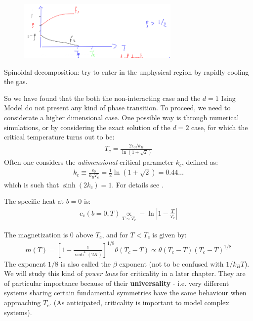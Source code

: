 \documentclass[../template.tex]{subfiles}
\begin{document}
\begin{figure}[H]
    \centering
    \includegraphics[width=0.7\textwidth]{image023.png}
    \caption{\label{fig:fluid-phases}}
\end{figure}

Spinoidal decomposition: try to enter in the unphysical region by rapidly cooling the gas. 


\medskip

So we have found that the both the non-interacting case and the $d=1$ Ising Model do not present any kind of phase transition. To proceed, we need to considerate a higher dimensional case. One possible way is through numerical simulations, or by considering the exact solution of the $d=2$ case, for which the critical temperature turns out to be:
\begin{align*}
    T_c = \frac{2 \epsilon_0 / k_B}{\ln (1 + \sqrt{2})} 
\end{align*}
Often one considers the \textit{adimensional} critical parameter $k_c$, defined as:
\begin{align*}
    k_c \equiv \frac{\epsilon_0}{k_B T_c} = \frac{1}{2} \ln (1 + \sqrt{2}) = 0.44\dots  
\end{align*} 
which is such that $\sinh(2k_c) = 1$. %
For details see \cite{huang}. 

The specific heat at $b=0$ is:
\begin{align*}
    c_v(b=0, T) \underset{T \sim T_c}{\propto} - \ln \left|1-\frac{T}{T_c}  \right|
\end{align*}

The magnetization is $0$ above $T_c$, and for $T < T_c$ is given by:
\begin{align*}
    m(T) = \left[1-\frac{1}{\sinh^4(2K)} \right]^{1/8} \theta(T_c-T) \propto \theta(T_c - T) (T_c - T)^{1/8}
\end{align*}
The exponent $1/8$ is also called the $\beta$ exponent (not to be confused with $1/k_B T$). We will study this kind of \textit{power laws} for criticality in a later chapter. They are of particular importance because of their \textbf{universality} - i.e. very different systems sharing certain fundamental symmetries have the same behaviour when approaching $T_c$. (As anticipated, criticality is important to model complex systems). 
\end{document}
